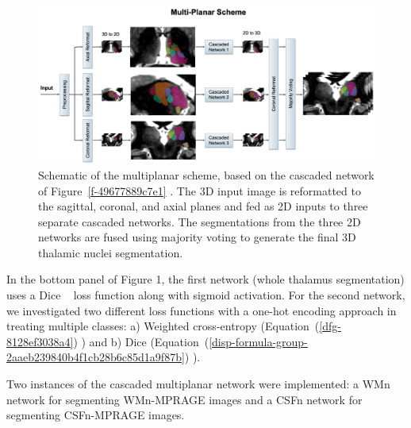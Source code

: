 \begin{figure}[!htbp]
\centering \includegraphics{Thalamus/images/slide2.jpeg}
\caption{Schematic of the multiplanar scheme, based on the cascaded network of Figure~\ref{f-49677889c7e1} . The 3D input image is reformatted to the sagittal, coronal, and axial planes and fed as 2D inputs to three separate cascaded networks. The segmentations from the three 2D networks are fused using majority voting to generate the final 3D thalamic nuclei segmentation. }
\label{f-afc126ad9a6a}
\end{figure}

In the bottom panel of Figure 1, the first network (whole thalamus segmentation) uses a Dice \unskip~\cite{1643371:26789956} loss function along with sigmoid activation. For the second network, we investigated two different loss functions with a one-hot encoding approach in treating multiple classes: a) Weighted cross-entropy (Equation~(\ref{dfg-8128ef3038a4}) ) and b) Dice (Equation~(\ref{disp-formula-group-2aaeb239840b4f1cb28b6c85d1a9f87b}) ).

Two instances of the cascaded multiplanar network were implemented: a WMn network for segmenting WMn-MPRAGE images and a CSFn network for segmenting CSFn-MPRAGE images.




